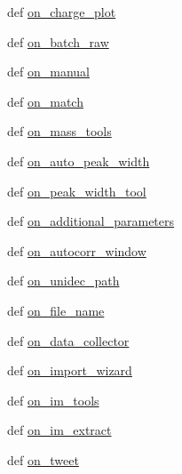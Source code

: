 \begin{DoxyCompactItemize}
def \hyperlink{class_uni_dec_1_1_g_uni_dec_1_1_uni_dec_app_a8eab970b6b93f8ed0c56dd332156ded6}{on\+\_\+charge\+\_\+plot}
\item 
def \hyperlink{class_uni_dec_1_1_g_uni_dec_1_1_uni_dec_app_af016c3f0b76c9927655662132e50d3a6}{on\+\_\+batch\+\_\+raw}
\item 
def \hyperlink{class_uni_dec_1_1_g_uni_dec_1_1_uni_dec_app_a733c255967fbcb96441e7d7b22adf9b9}{on\+\_\+manual}
\item 
def \hyperlink{class_uni_dec_1_1_g_uni_dec_1_1_uni_dec_app_adf9adcdace2f275711689f83cb9f0839}{on\+\_\+match}
\item 
def \hyperlink{class_uni_dec_1_1_g_uni_dec_1_1_uni_dec_app_a1a5d0bb53076945017f0f7f4324c728e}{on\+\_\+mass\+\_\+tools}
\item 
def \hyperlink{class_uni_dec_1_1_g_uni_dec_1_1_uni_dec_app_ad89aa3c9efc5166ae4790f85c7d19dd1}{on\+\_\+auto\+\_\+peak\+\_\+width}
\item 
def \hyperlink{class_uni_dec_1_1_g_uni_dec_1_1_uni_dec_app_a35b390ed7644a5652549e75e08f06f88}{on\+\_\+peak\+\_\+width\+\_\+tool}
\item 
def \hyperlink{class_uni_dec_1_1_g_uni_dec_1_1_uni_dec_app_a435c27080ab74c687cddf28429c77469}{on\+\_\+additional\+\_\+parameters}
\item 
def \hyperlink{class_uni_dec_1_1_g_uni_dec_1_1_uni_dec_app_a192cc2c7a52a411bdb8a5b7d392959f2}{on\+\_\+autocorr\+\_\+window}
\item 
def \hyperlink{class_uni_dec_1_1_g_uni_dec_1_1_uni_dec_app_af5bec633e6172fd9b1b00097215f25ce}{on\+\_\+unidec\+\_\+path}
\item 
def \hyperlink{class_uni_dec_1_1_g_uni_dec_1_1_uni_dec_app_a5df76099c18d4e4d02794b9d67a3d800}{on\+\_\+file\+\_\+name}
\item 
def \hyperlink{class_uni_dec_1_1_g_uni_dec_1_1_uni_dec_app_a47102b4d617a58fb709bb943546d6e39}{on\+\_\+data\+\_\+collector}
\item 
def \hyperlink{class_uni_dec_1_1_g_uni_dec_1_1_uni_dec_app_a0fb954bd1bbc5f8bebad4183b960de6b}{on\+\_\+import\+\_\+wizard}
\item 
def \hyperlink{class_uni_dec_1_1_g_uni_dec_1_1_uni_dec_app_aac0263c187aa91f3b3c99e2349b8c86f}{on\+\_\+im\+\_\+tools}
\item 
def \hyperlink{class_uni_dec_1_1_g_uni_dec_1_1_uni_dec_app_ad12183777d2b844489e929a8cf255349}{on\+\_\+im\+\_\+extract}
\item 
def \hyperlink{class_uni_dec_1_1_g_uni_dec_1_1_uni_dec_app_a445599c67bc59306796f4a0ff5617beb}{on\+\_\+tweet}

\end{DoxyCompactItemize}
